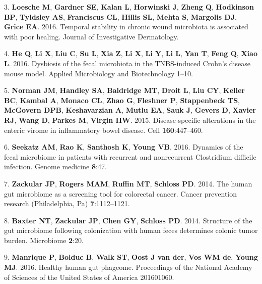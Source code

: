 \documentclass[12pt,]{article}
\begin{document}
\hypertarget{ref-Loesche:2016ev}{}
3. \textbf{Loesche M}, \textbf{Gardner SE}, \textbf{Kalan L},
\textbf{Horwinski J}, \textbf{Zheng Q}, \textbf{Hodkinson BP},
\textbf{Tyldsley AS}, \textbf{Franciscus CL}, \textbf{Hillis SL},
\textbf{Mehta S}, \textbf{Margolis DJ}, \textbf{Grice EA}. 2016.
Temporal stability in chronic wound microbiota is associated with poor
healing. Journal of Investigative Dermatology.

\hypertarget{ref-He:2016ch}{}
4. \textbf{He Q}, \textbf{Li X}, \textbf{Liu C}, \textbf{Su L},
\textbf{Xia Z}, \textbf{Li X}, \textbf{Li Y}, \textbf{Li L}, \textbf{Yan
T}, \textbf{Feng Q}, \textbf{Xiao L}. 2016. Dysbiosis of the fecal
microbiota in the TNBS-induced Crohn's disease mouse model. Applied
Microbiology and Biotechnology 1--10.

\hypertarget{ref-Norman:2015kb}{}
5. \textbf{Norman JM}, \textbf{Handley SA}, \textbf{Baldridge MT},
\textbf{Droit L}, \textbf{Liu CY}, \textbf{Keller BC}, \textbf{Kambal
A}, \textbf{Monaco CL}, \textbf{Zhao G}, \textbf{Fleshner P},
\textbf{Stappenbeck TS}, \textbf{McGovern DPB}, \textbf{Keshavarzian A},
\textbf{Mutlu EA}, \textbf{Sauk J}, \textbf{Gevers D}, \textbf{Xavier
RJ}, \textbf{Wang D}, \textbf{Parkes M}, \textbf{Virgin HW}. 2015.
Disease-specific alterations in the enteric virome in inflammatory bowel
disease. Cell \textbf{160}:447--460.

\hypertarget{ref-Seekatz:2016fz}{}
6. \textbf{Seekatz AM}, \textbf{Rao K}, \textbf{Santhosh K},
\textbf{Young VB}. 2016. Dynamics of the fecal microbiome in patients
with recurrent and nonrecurrent Clostridium difficile infection. Genome
medicine \textbf{8}:47.

\hypertarget{ref-Zackular:2014fba}{}
7. \textbf{Zackular JP}, \textbf{Rogers MAM}, \textbf{Ruffin MT},
\textbf{Schloss PD}. 2014. The human gut microbiome as a screening tool
for colorectal cancer. Cancer prevention research (Philadelphia, Pa)
\textbf{7}:1112--1121.

\hypertarget{ref-Baxter:2014hb}{}
8. \textbf{Baxter NT}, \textbf{Zackular JP}, \textbf{Chen GY},
\textbf{Schloss PD}. 2014. Structure of the gut microbiome following
colonization with human feces determines colonic tumor burden.
Microbiome \textbf{2}:20.

\hypertarget{ref-Manrique:2016dx}{}
9. \textbf{Manrique P}, \textbf{Bolduc B}, \textbf{Walk ST},
\textbf{Oost J van der}, \textbf{Vos WM de}, \textbf{Young MJ}. 2016.
Healthy human gut phageome. Proceedings of the National Academy of
Sciences of the United States of America 201601060.
\end{document}
